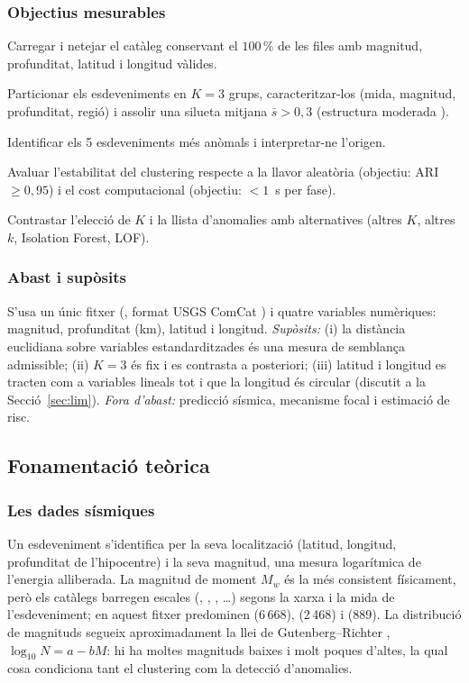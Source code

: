 \documentclass[a4paper,11pt]{article}
\providecommand{\py}[1]{\texttt{\detokenize{#1}}}
\begin{document}
\subsubsection{Objectius mesurables}
\begin{description}[leftmargin=1.1cm,labelwidth=0.9cm]
\item[O1] Carregar i netejar el catàleg conservant el $100\,\%$ de les files amb magnitud, profunditat, latitud i longitud vàlides.
\item[O2] Particionar els esdeveniments en $K=3$ grups, caracteritzar-los (mida, magnitud, profunditat, regió) i assolir una silueta mitjana $\bar s>0{,}3$ (estructura moderada \cite{kaufman}).
\item[O3] Identificar els 5 esdeveniments més anòmals i interpretar-ne l'origen.
\item[O4] Avaluar l'estabilitat del clustering respecte a la llavor aleatòria (objectiu: ARI $\ge0{,}95$) i el cost computacional (objectiu: $<1$~s per fase).
\item[O5] Contrastar l'elecció de $K$ i la llista d'anomalies amb alternatives (altres $K$, altres $k$, Isolation Forest, LOF).
\end{description}

\subsubsection{Abast i supòsits}
S'usa un únic fitxer (\py{earthquakes.csv}, format USGS ComCat \cite{usgs}) i quatre variables numèriques: magnitud, profunditat (km), latitud i longitud. \emph{Supòsits:} (i) la distància euclidiana sobre variables estandarditzades és una mesura de semblança admissible; (ii) $K=3$ és fix i es contrasta a posteriori; (iii) latitud i longitud es tracten com a variables lineals tot i que la longitud és circular (discutit a la Secció~\ref{sec:lim}). \emph{Fora d'abast:} predicció sísmica, mecanisme focal i estimació de risc.

\subsection{Fonamentaci\'o te\`orica}
\subsubsection{Les dades s\'ismiques}
Un esdeveniment s'identifica per la seva localitzaci\'o (latitud, longitud, profunditat de l'hipocentre) i la seva magnitud, una mesura logar\'itmica de l'energia alliberada. La magnitud de moment $M_w$ \cite{hanks} \'es la m\'es consistent f\'isicament, per\`o els catàlegs barregen escales (\py{ml}, \py{md}, \py{mb}, \py{mww}\ldots) segons la xarxa i la mida de l'esdeveniment; en aquest fitxer predominen \py{ml} (6\,668), \py{md} (2\,468) i \py{mb} (889). La distribuci\'o de magnituds segueix aproximadament la llei de Gutenberg--Richter \cite{gr}, $\log_{10}N=a-bM$: hi ha moltes magnituds baixes i molt poques d'altes, la qual cosa condiciona tant el clustering com la detecci\'o d'anomalies.
\end{document}

